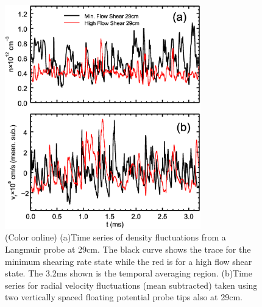 \documentclass[aip,pop,amsmath,amssymb,peprint,superscriptaddress]{revtex4-1} %
\begin{document}
\begin{figure}[!htbp]
\centerline{
\includegraphics[width=8.5cm]{figure2.eps}}
\caption{\label{fig:timeseries} (Color online) (a)Time series of density fluctuations from a Langmuir probe at 29cm. The black curve shows the trace for the minimum shearing rate state while the red is for a high flow shear state. The 3.2ms shown is the temporal averaging region. (b)Time series for radial velocity fluctuations (mean subtracted) taken using two vertically spaced floating potential probe tips also at 29cm.}
\end{figure}
\end{document}
